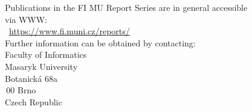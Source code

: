{{\noindent
\begin{tabbing}
Publications in the FI MU Report Series are in general accessible \\via
WWW: \\[1ex]
\hspace{\odsaz}\ \= \url{https://www.fi.muni.cz/reports/}\\[4ex]
%
Further information can be obtained by contacting: \\[1ex]
\> Faculty of Informatics\\
\> Masaryk University\\
\> Botanická 68a\\
\,00 Brno\\
\> Czech Republic
\end{tabbing}
}}

